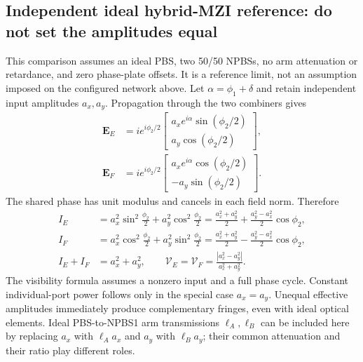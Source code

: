 \subsection{Independent ideal hybrid-MZI reference: do not set the amplitudes equal}
This comparison assumes an ideal PBS, two 50/50 NPBSs, no arm attenuation or
retardance, and zero phase-plate offsets. It is a reference limit, not an
assumption imposed on the configured network above. Let
$\alpha=\phi_1+\delta$ and retain independent input amplitudes $a_x,a_y$.
Propagation through the two combiners gives
\begin{align}
\mathbf E_E &= i e^{i\phi_2/2}
\begin{bmatrix}a_xe^{i\alpha}\sin(\phi_2/2)\\a_y\cos(\phi_2/2)\end{bmatrix},\\
\mathbf E_F &= i e^{i\phi_2/2}
\begin{bmatrix}a_xe^{i\alpha}\cos(\phi_2/2)\\-a_y\sin(\phi_2/2)\end{bmatrix}.
\end{align}
The shared phase has unit modulus and cancels in each field norm. Therefore
\begin{align}
I_E &= a_x^2\sin^2\!\frac{\phi_2}{2}+a_y^2\cos^2\!\frac{\phi_2}{2}
=\frac{a_x^2+a_y^2}{2}+\frac{a_y^2-a_x^2}{2}\cos\phi_2,\\
I_F &= a_x^2\cos^2\!\frac{\phi_2}{2}+a_y^2\sin^2\!\frac{\phi_2}{2}
=\frac{a_x^2+a_y^2}{2}-\frac{a_y^2-a_x^2}{2}\cos\phi_2,\\
I_E+I_F&=a_x^2+a_y^2,\qquad
\mathcal V_E=\mathcal V_F=\frac{|a_x^2-a_y^2|}{a_x^2+a_y^2}.
\end{align}
The visibility formula assumes a nonzero input and a full phase cycle.
Constant individual-port power follows only in the special case $a_x=a_y$.
Unequal effective amplitudes immediately produce complementary fringes, even
with ideal optical elements. Ideal PBS-to-NPBS1 arm transmissions $\ell_A,\ell_B$
can be included here by replacing $a_x$ with $\ell_A a_x$ and $a_y$ with
$\ell_B a_y$; their common attenuation and their ratio play different roles.

